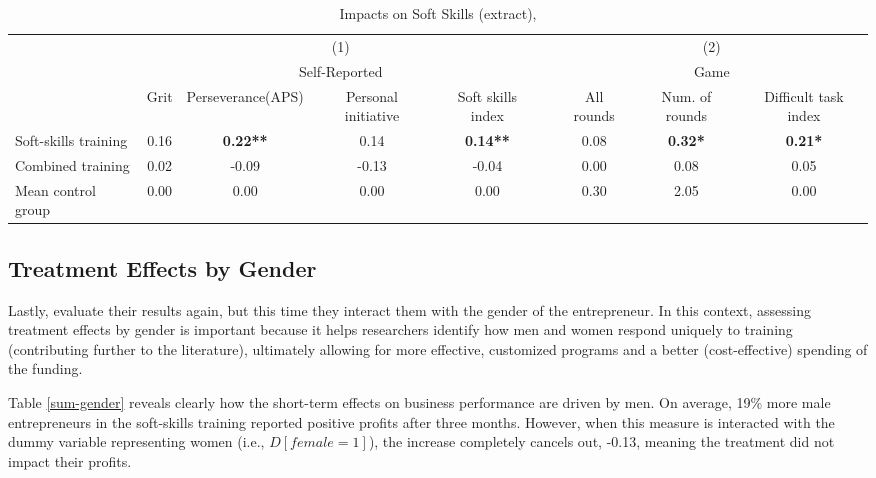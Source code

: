 \begin{table}
\centering
\caption{Impacts on Soft Skills (extract), \cite{Ubfal2022}}
\label{sum-soft-skills}
\begin{adjustbox}{width=\textwidth}
\begin{tabular}{lcccclccc} 
\toprule
                     & \multicolumn{4}{c}{(1)}                                            &  & \multicolumn{3}{c}{(2)}                             \\
                     & \multicolumn{4}{c}{Self-Reported}                                  &  & \multicolumn{3}{c}{Game}                            \\ 
\cline{2-5}\cline{7-9}
                     & Grit & Perseverance(APS) & Personal initiative & Soft skills index &  & All rounds & Num. of rounds & Difficult task index  \\ 
\hline
Soft-skills training & 0.16 & \textbf{0.22**}   & 0.14                & \textbf{0.14**}   &  & 0.08       & \textbf{0.32*} & \textbf{0.21*}        \\
Combined training    & 0.02 & -0.09             & -0.13               & -0.04             &  & 0.00       & 0.08           & 0.05                  \\
Mean control group   & 0.00 & 0.00              & 0.00                & 0.00              &  & 0.30       & 2.05           & 0.00                  \\
\bottomrule
\end{tabular}
\end{adjustbox}
\end{table}

\subsection{Treatment Effects by Gender}

Lastly, \cite{Ubfal2022} evaluate their results again, but this time they interact them with the gender of the entrepreneur. In this context, assessing treatment effects by gender is important because it helps researchers identify how men and women respond uniquely to training (contributing further to the literature), ultimately allowing for more effective, customized programs and a better (cost-effective) spending of the funding.

Table \ref{sum-gender} reveals clearly how the short-term effects on business performance are driven by men. On average, 19\% more male entrepreneurs in the soft-skills training reported positive profits after three months. However, when this measure is interacted with the dummy variable representing women (i.e., $D[female=1]$), the increase completely cancels out, -0.13, meaning the treatment did not impact their profits.

